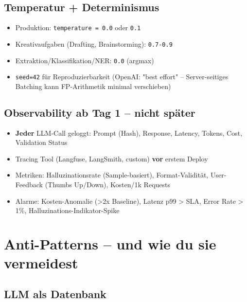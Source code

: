 \subsection{Temperatur + Determinismus}

\begin{itemize}[leftmargin=*]
    \item Produktion: \texttt{temperature = 0.0} oder \texttt{0.1}
    \item Kreativaufgaben (Drafting, Brainstorming): \texttt{0.7-0.9}
    \item Extraktion/Klassifikation/NER: \texttt{0.0} (argmax)
    \item \texttt{seed=42} für Reproduzierbarkeit (OpenAI: "best effort" -- Server-seitiges Batching kann FP-Arithmetik minimal verschieben)
\end{itemize}

\subsection{Observability ab Tag 1 -- nicht \glqq später\grqq}

\begin{itemize}[leftmargin=*]
    \item \textbf{Jeder} LLM-Call geloggt: Prompt (Hash), Response, Latency, Tokens, Cost, Validation Status
    \item Tracing Tool (Langfuse, LangSmith, custom) \textbf{vor} erstem Deploy
    \item Metriken: Halluzinationsrate (Sample-basiert), Format-Validität, User-Feedback (Thumbs Up/Down), Kosten/1k Requests
    \item Alarme: Kosten-Anomalie (>2x Baseline), Latenz p99 > SLA, Error Rate > 1\%, Halluzinations-Indikator-Spike
\end{itemize}


\section{Anti-Patterns -- und wie du sie vermeidest}

\subsection{LLM als Datenbank}

